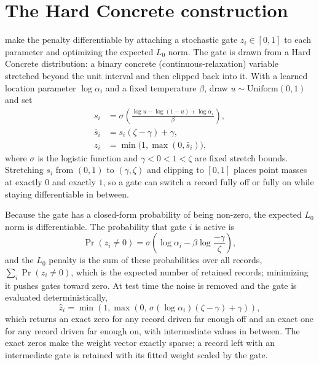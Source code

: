 \section{The Hard Concrete construction}
\label{sp:app:hardconcrete}

\citet{louizos2018} make the penalty differentiable by attaching a stochastic gate $z_i \in [0, 1]$
to each parameter and optimizing the expected $L_0$ norm. The gate is drawn from a Hard Concrete
distribution: a binary concrete (continuous-relaxation) variable stretched beyond the unit interval
and then clipped back into it. With a learned location parameter $\log \alpha_i$ and a fixed
temperature $\beta$, draw $u \sim \mathrm{Uniform}(0, 1)$ and set
\begin{align}
    s_i      &= \sigma\!\left(\frac{\log u - \log(1 - u) + \log \alpha_i}{\beta}\right), \\
    \bar{s}_i &= s_i (\zeta - \gamma) + \gamma, \\
    z_i      &= \min\!\big(1, \max(0, \bar{s}_i)\big),
    \label{sp:eq:hardconcrete}
\end{align}
where $\sigma$ is the logistic function and $\gamma < 0 < 1 < \zeta$ are fixed stretch bounds.
Stretching $s_i$ from $(0, 1)$ to $(\gamma, \zeta)$ and clipping to $[0, 1]$ places point masses at
exactly $0$ and exactly $1$, so a gate can switch a record fully off or fully on while staying
differentiable in between.

Because the gate has a closed-form probability of being non-zero, the expected $L_0$ norm is
differentiable. The probability that gate $i$ is active is
\begin{equation}
    \Pr(z_i \neq 0) = \sigma\!\left(\log \alpha_i - \beta \log \frac{-\gamma}{\zeta}\right),
    \label{sp:eq:l0penalty}
\end{equation}
and the $L_0$ penalty is the sum of these probabilities over all records,
$\sum_i \Pr(z_i \neq 0)$, which is the expected number of retained records; minimizing it pushes
gates toward zero. At test time the noise is removed and the gate is evaluated deterministically,
\begin{equation}
    \hat{z}_i
    =
    \min\!\left(
        1,
        \max\!\left(
            0,\,
            \sigma(\log \alpha_i)(\zeta - \gamma) + \gamma
        \right)
    \right),
    \label{sp:eq:deterministic_gate}
\end{equation}
which returns an exact zero for any record driven far enough off and an exact one for any record driven
far enough on, with intermediate values in between. The exact zeros make the weight vector exactly
sparse; a record left with an intermediate gate is retained with its fitted weight scaled by the gate.


